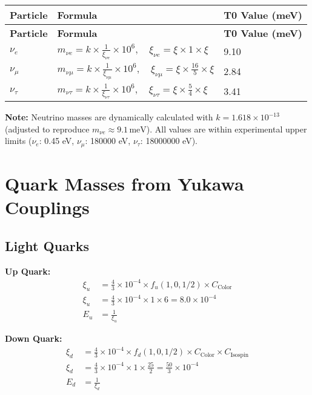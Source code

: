 \documentclass[12pt,a4paper]{article}
\begin{document}
	\begin{longtable}{|p{3cm}|p{4cm}|p{3cm}|}
		\hline
		\textbf{Particle} & \textbf{Formula} & \textbf{T0 Value (meV)} \\
		\hline
		\endfirsthead
		\hline
		\textbf{Particle} & \textbf{Formula} & \textbf{T0 Value (meV)} \\
		\hline
		\endhead
		\(\nu_e\) & \(m_{\nu e} = k \times \frac{1}{\xi_{\nu e}} \times 10^6, \quad \xi_{\nu e} = \xi \times 1 \times \xi\) & 9.10 \\
		\hline
		\(\nu_{\mu}\) & \(m_{\nu \mu} = k \times \frac{1}{\xi_{\nu \mu}} \times 10^6, \quad \xi_{\nu \mu} = \xi \times \frac{16}{5} \times \xi\) & 2.84 \\
		\hline
		\(\nu_{\tau}\) & \(m_{\nu \tau} = k \times \frac{1}{\xi_{\nu \tau}} \times 10^6, \quad \xi_{\nu \tau} = \xi \times \frac{5}{4} \times \xi\) & 3.41 \\
		\hline
	\end{longtable}
	
	\textbf{Note:} Neutrino masses are dynamically calculated with \( k = 1.618 \times 10^{-13} \) (adjusted to reproduce \( m_{\nu e} \approx 9.1 \, \text{meV} \)). All values are within experimental upper limits (\(\nu_e\): 0.45 eV, \(\nu_\mu\): 180000 eV, \(\nu_\tau\): 18000000 eV).
	
	\section{Quark Masses from Yukawa Couplings}
	
	\subsection{Light Quarks}
	
	\textbf{Up Quark:}
	\begin{align}
		\xi_u &= \frac{4}{3} \times 10^{-4} \times f_u(1,0,1/2) \times C_{\text{Color}} \\
		\xi_u &= \frac{4}{3} \times 10^{-4} \times 1 \times 6 = 8.0 \times 10^{-4} \\
		E_u &= \frac{1}{\xi_u}
	\end{align}
	
	\textbf{Down Quark:}
	\begin{align}
		\xi_d &= \frac{4}{3} \times 10^{-4} \times f_d(1,0,1/2) \times C_{\text{Color}} \times C_{\text{Isospin}} \\
		\xi_d &= \frac{4}{3} \times 10^{-4} \times 1 \times \frac{25}{2} = \frac{50}{3} \times 10^{-4} \\
		E_d &= \frac{1}{\xi_d}
	\end{align}
	
\end{document}
